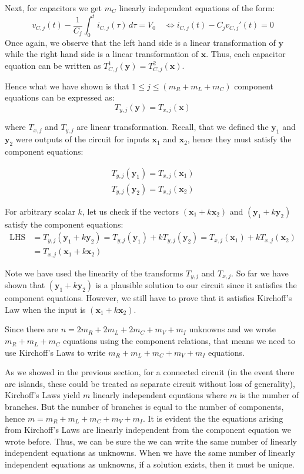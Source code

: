 \documentclass[14pt,a5paper,twoside]{book}
\begin{document}
Next, for capacitors we get $m_C$ linearly independent equations of the form:
$$
v_{C,j}(t) - \frac{1}{C_j}\int_0^t i_{C,j}(\tau)\,d\tau = V_{0} \quad\iff i_{C,j}(t) - C_j v_{C,j}'(t) =0
$$
Once again, we observe that the left hand side is a linear transformation of $\mathbf{y}$ while the right hand side is a linear transformation of $\mathbf{x}$. Thus, each capacitor equation can be written as $T_{C,j}^1 (\mathbf{y}) = T_{C,j}^2 (\mathbf{x})$.

Hence what we have shown is that $1\leq j\leq(m_R + m_L + m_C)$ component equations can be expressed as:
$$
T_{y,j} (\mathbf{y}) = T_{x,j}(\mathbf{x})
$$

where $T_{x,j}$ and $T_{y,j}$ are linear transformation. Recall, that we defined the $\mathbf{y}_1$ and $\mathbf{y}_2$ were outputs of the circuit for inputs $\mathbf{x}_1$ and $\mathbf{x}_2$, hence they must satisfy the component equations:

\begin{align*}
T_{y,j}(\mathbf{y}_1) = T_{x,j}(\mathbf{x}_1) \\
T_{y,j}(\mathbf{y}_2) = T_{x,j}(\mathbf{x}_2)
\end{align*}

For arbitrary scalar $k$, let us check if the vectors $(\mathbf{x}_1+k\mathbf{x}_2)$ and $(\mathbf{y}_1+k\mathbf{y}_2)$ satisfy the component equations:
\begin{align*}
\mathrm{LHS} &= T_{y,j}(\mathbf{y}_1+k\mathbf{y}_2) = T_{y,j}(\mathbf{y}_1)+kT_{y,j}(\mathbf{y}_2) = T_{x,j}(\mathbf{x}_1)+kT_{x,j}(\mathbf{x}_2) \\ &= T_{x,j}(\mathbf{x}_1+k\mathbf{x}_2)
\end{align*}

Note we have used the linearity of the transforms $T_{y,j}$ and $T_{x,j}$. So far we have shown that $(\mathbf{y}_1+k\mathbf{y}_2)$ is a plausible solution to our circuit since it satisfies the component equations. However, we still have to prove that it satisfies Kirchoff's Law when the input is $(\mathbf{x}_1+k\mathbf{x}_2)$.

Since there are $n=2m_R + 2m_L + 2m_C + m_V + m_I$ unknowns and we wrote $m_R + m_L + m_C$ equations using the component relations, that means we need to use Kirchoff's Laws to write $m_R + m_L + m_C + m_V + m_I$ equations.

As we showed in the previous section, for a connected circuit (in the event there are islands, these could be treated as separate circuit without loss of generality), Kirchoff's Laws yield $m$ linearly independent equations where $m$ is the number of branches. But the number of branches is equal to the number of components, hence $m = m_R + m_L + m_C + m_V + m_I$. It is evident the the equations arising from Kirchoff's Laws are linearly independent from the component equation we wrote before. Thus, we can be sure the we can write the same number of linearly independent equations as unknowns. When we have the same number of linearly independent equations as unknowns, if a solution exists, then it must be unique.
\end{document}
